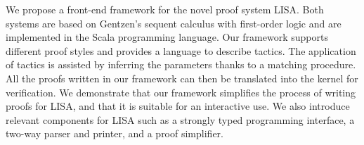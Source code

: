 \newenvironment{abstractpage}
  {\cleardoublepage\vspace*{\fill}\thispagestyle{empty}}
  {\vfill\cleardoublepage}
\newenvironment{i18nabstract}[1]
  {\bigskip\selectlanguage{#1}%
   \begin{center}\bfseries\abstractname\end{center}}
  {\par\bigskip}

\begin{abstractpage}
\begin{i18nabstract}{english}
  We propose a front-end framework for the novel proof system LISA. Both systems are based on Gentzen's sequent calculus with first-order logic and are implemented in the Scala programming language. Our framework supports different proof styles and provides a language to describe tactics. The application of tactics is assisted by inferring the parameters thanks to a matching procedure. All the proofs written in our framework can then be translated into the kernel for verification. We demonstrate that our framework simplifies the process of writing proofs for LISA, and that it is suitable for an interactive use. We also introduce relevant components for LISA such as a strongly typed programming interface, a two-way parser and printer, and a proof simplifier.
\end{i18nabstract}

\begin{i18nabstract}{french}
  \lipsum[1]
\end{i18nabstract}
\end{abstractpage}
